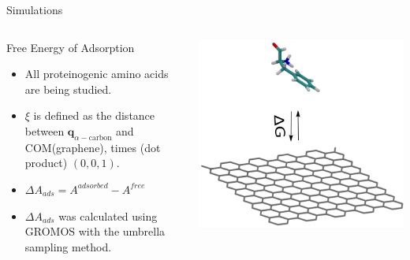 \documentclass[aspectratio=169, compress]{beamer}
\begin{document}
\begin{frame}{Simulations}
  \begin{columns}
    \begin{column}{.5\textwidth}
      \begin{block}{Free Energy of Adsorption}
        \begin{itemize}
        \item All proteinogenic amino acids are being studied.
        \item $\xi$ is defined as the distance between
          $\mathbf{q}_{\alpha-\mathrm{carbon}} $ and COM(graphene),
          times (dot product) $(0, 0, 1)$.
        \item $\Delta A_{ads} = A^{adsorbed} - A^{free}$
        \item $\Delta A_{ads}$ was calculated using GROMOS with
          the umbrella sampling method.
        \end{itemize}
      \end{block}
    \end{column}
    \begin{column}{.5\textwidth}
      \centering
      \includegraphics[width=\textwidth]{figures/Adsorption}
    \end{column}
  \end{columns}
\end{frame}
\end{document}
